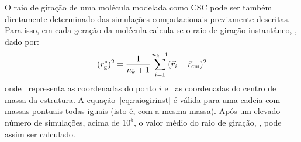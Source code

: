 O raio de giração de uma molécula modelada como CSC pode ser também diretamente determinado das simulações computacionais previamente descritas. Para isso, em cada geração da molécula calcula-se o raio de giração instantâneo, \raiogiracaoinst, dado por:
%
\begin{equation}
\label{eq:raiogirinst}
(r_{\mathrm{g}}^{*})^{2}=\frac{1}{n_{k}+1}\sum_{i=1}^{n_{k}+1} (\vec{r}_{i}-\vec{r}_{\mathrm{cm}})^{2}
\end{equation}
onde \vectorpos\ representa as coordenadas do ponto $i$ e \vectorcm\ as coordenadas do centro de massa da estrutura.
%
%
A equação~\ref{eq:raiogirinst} é válida para uma cadeia com massas pontuais todas iguais (isto é, com a mesma massa). Após um elevado número de simulações, acima de $10^{5}$, o valor médio do raio de giração, \raiogiracao, pode assim ser calculado. 


